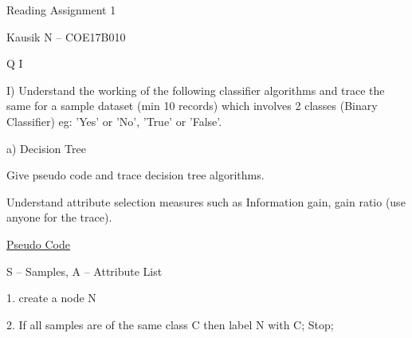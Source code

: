 \documentclass[12pt]{article}
\renewcommand{\_}{\kern-1.5pt\textunderscore\kern-1.5pt}
\begin{document}
\begin{Center}
{\fontsize{20pt}{24.0pt}\selectfont Reading Assignment 1\par}
\end{Center}\par

\begin{Center}
Kausik N – COE17B010
\end{Center}\par

\begin{Center}
{\fontsize{28pt}{33.6pt}\selectfont Q I\par}
\end{Center}\par

{\fontsize{14pt}{16.8pt}\selectfont I) Understand the working of the following classifier algorithms and trace the same for a sample dataset (min 10 records) which involves 2 classes (Binary Classifier) eg: 'Yes' or 'No’, 'True' or 'False'. \par}\par


\vspace{\baselineskip}
\begin{Center}
{\fontsize{18pt}{21.6pt}\selectfont a) Decision Tree\par}
\end{Center}\par


\vspace{\baselineskip}
{\fontsize{14pt}{16.8pt}\selectfont Give pseudo code and trace decision tree algorithms.\par}\par

{\fontsize{14pt}{16.8pt}\selectfont Understand attribute selection measures such as Information gain, gain ratio (use anyone for the trace).\par}\par


\vspace{\baselineskip}
{\fontsize{14pt}{16.8pt}\selectfont \uline{Pseudo Code}\par}\par

S – Samples, A – Attribute List\par

1. create a node N \par

2. If all samples are of the same class C then label N with C; Stop; \par
\end{document}
